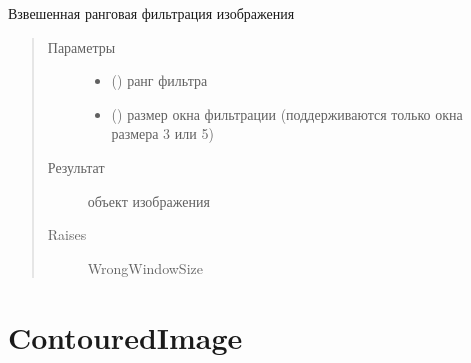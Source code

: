 \documentclass[letterpaper,10pt,russian]{sphinxmanual}
\begin{document}
\begin{fulllineitems}
\begin{fulllineitems}
\label{\detokenize{FilteredImage:FilteredImage.FilteredImage.weighted_rank_filter}}
Взвешенная ранговая фильтрация изображения
\begin{quote}\begin{description}
\item[{Параметры}] \leavevmode\begin{itemize}
\item {} 
 () \textendash{} ранг фильтра

\item {} 
 () \textendash{} размер окна фильтрации (поддерживаются только окна размера 3 или 5)

\end{itemize}

\item[{Результат}] \leavevmode
{\hyperref[\detokenize{BaseImage:core.LabImage}]{}} \textendash{} объект изображения

\item[{Raises}] \leavevmode
WrongWindowSize

\end{description}\end{quote}

\end{fulllineitems}


\end{fulllineitems}



\section{ContouredImage}
\label{\detokenize{ContouredImage:contouredimage}}\label{\detokenize{ContouredImage::doc}}
\end{document}
